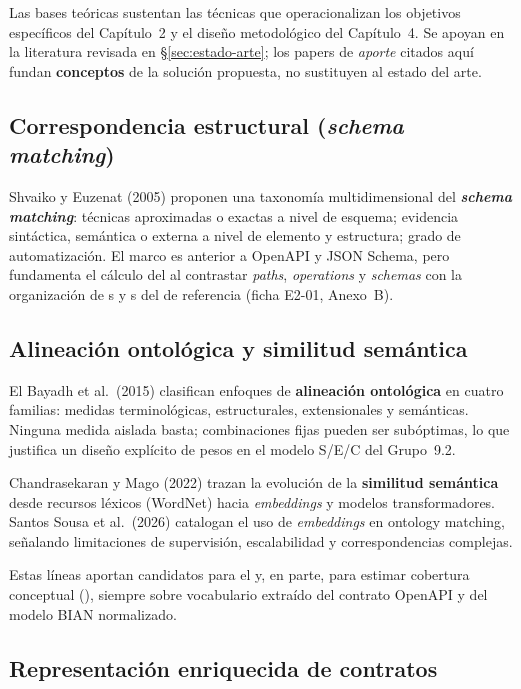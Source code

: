 Las bases teóricas sustentan las técnicas que operacionalizan los objetivos específicos del
Capítulo~2 y el diseño metodológico del Capítulo~4. Se apoyan en la literatura revisada en
§\ref{sec:estado-arte}; los papers de \textit{aporte} citados aquí fundan \textbf{conceptos} de la
solución propuesta, no sustituyen al estado del arte.

\subsection{Correspondencia estructural (\textit{schema matching})}

Shvaiko y Euzenat (2005) proponen una taxonomía multidimensional del \textbf{\textit{schema
matching}}: técnicas aproximadas o exactas a nivel de esquema; evidencia sintáctica, semántica o
externa a nivel de elemento y estructura; grado de automatización. El marco es anterior a OpenAPI y
JSON Schema, pero fundamenta el cálculo del \StructuralScore{} al contrastar \textit{paths},
\textit{operations} y \textit{schemas} con la organización de \Behavior{}s y \BusinessObject{}s del
\ServiceDomain{} de referencia (ficha E2-01, Anexo~B).

\subsection{Alineación ontológica y similitud semántica}

El Bayadh et al.\ (2015) clasifican enfoques de \textbf{alineación ontológica} en cuatro familias:
medidas terminológicas, estructurales, extensionales y semánticas. Ninguna medida aislada basta;
combinaciones fijas pueden ser subóptimas, lo que justifica un diseño explícito de pesos en el
modelo S/E/C del Grupo~9.2.

Chandrasekaran y Mago (2022) trazan la evolución de la \textbf{similitud semántica} desde recursos
léxicos (WordNet) hacia \textit{embeddings} y modelos transformadores. Santos Sousa et al.\ (2026)
catalogan el uso de \textit{embeddings} en ontology matching, señalando limitaciones de supervisión,
escalabilidad y correspondencias complejas.

Estas líneas aportan candidatos para el \SemanticScore{} y, en parte, para estimar cobertura
conceptual (\CoverageScore{}), siempre sobre vocabulario extraído del contrato OpenAPI y del modelo
BIAN normalizado.

\subsection{Representación enriquecida de contratos}

